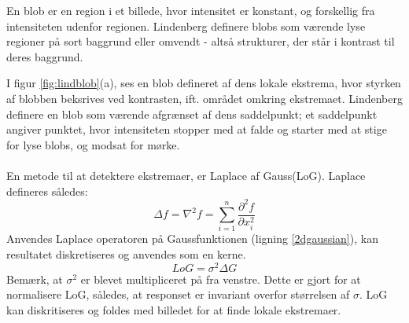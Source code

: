 En blob er en region i et billede, hvor intensitet er konstant, og forskellig fra intensiteten udenfor regionen. Lindenberg \cite{blob} definere blobs som værende lyse regioner på sort baggrund eller omvendt - altså strukturer, der står i kontrast til deres baggrund. 

I figur \ref{fig:lindblob}(a), ses en blob defineret af dens lokale ekstrema, hvor styrken af blobben beksrives ved kontrasten, ift. området omkring ekstremaet. Lindenberg definere en blob som værende afgrænset af dens saddelpunkt; et saddelpunkt angiver punktet, hvor intensiteten stopper med at falde og starter med at stige for lyse blobs, og modsat for mørke.
\\
\\
En metode til at detektere ekstremaer, er Laplace af Gauss(LoG). Laplace defineres således:
\begin{equation}
\Delta f = \nabla^2 f =  \sum_{i = 1}^n \frac{\partial^2 f}{\partial x^2_i}
\end{equation}
Anvendes Laplace operatoren på Gaussfunktionen (ligning \eqref{2dgaussian}), kan resultatet diskretiseres og anvendes som en kerne.
\begin{equation}
LoG= \sigma^2\Delta G
\label{lap}
\end{equation}
Bemærk, at $\sigma^2$ er blevet multipliceret på fra venstre. Dette er gjort for at normalisere LoG, således, at responset er invariant overfor størrelsen af $\sigma$. LoG kan diskritiseres og foldes med billedet for at finde lokale ekstremaer. \\

